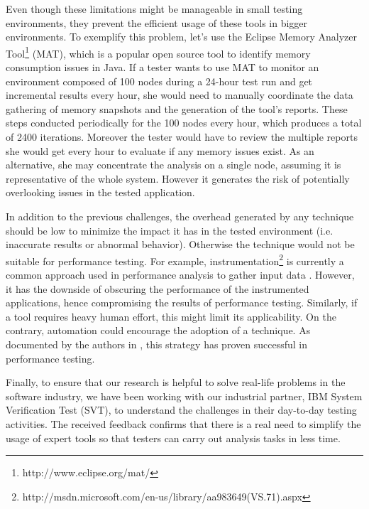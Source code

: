\documentclass[runningheads,a4paper]{llncs}
\begin{document}
Even though these limitations might be manageable in small testing environments,
they prevent the efficient usage of these tools in bigger environments. To
exemplify this problem, let's use the Eclipse Memory Analyzer
Tool\footnote{http://www.eclipse.org/mat/} (MAT), which is a popular open source
tool to identify memory consumption issues in Java. If a tester wants to use MAT
to monitor an environment composed of 100 nodes during a 24-hour test run and 
get incremental results every hour, she would need to manually coordinate the
data gathering of memory snapshots and the generation of the tool's reports.
These steps conducted periodically for the 100 nodes every hour, which
produces a total of 2400 iterations. Moreover the tester would have to review
the multiple reports she would get every hour to evaluate if any memory issues
exist. As an alternative, she may concentrate the analysis on a single node,
assuming it is representative of the whole system. However it generates the risk of
potentially overlooking issues in the tested application.

In addition to the previous challenges, the overhead generated by any technique
should be low
to minimize the impact it has in the
tested environment (i.e. inaccurate results or abnormal behavior). Otherwise the
technique would not be suitable for performance testing. For example,
instrumentation\footnote{http://msdn.microsoft.com/en-us/library/aa983649(VS.71).aspx}
is currently a common approach used in performance analysis to gather input data
\cite{Yang1,Hangal1,Csallner1,Chen2}. However, it has the downside of obscuring
the performance of the instrumented applications, hence compromising the results of 
performance testing. 
Similarly, if a tool requires heavy human effort, this might limit its 
applicability. On the contrary, automation could encourage the adoption of a technique. As documented by the authors in \cite{Shahamiri1},
this strategy has proven successful in performance testing. %

Finally, to ensure that our research is helpful to solve real-life
problems in the software industry, we have been working with our industrial
partner, IBM System Verification Test (SVT), to understand the challenges
in their day-to-day testing activities. The received
feedback confirms that there is a real need to simplify the usage of expert
tools so that testers can carry out analysis tasks in less time.
\end{document}
